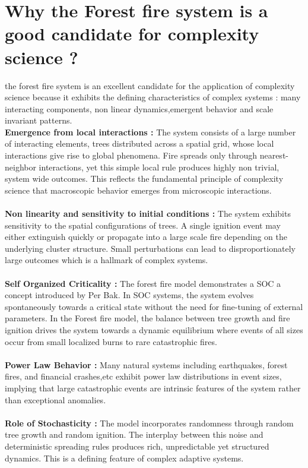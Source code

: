 \documentclass{article}
\begin{document}
\section{Why the Forest fire system is a good candidate for complexity science ?}
the forest fire system is an excellent candidate for the application of complexity science because it exhibits the defining characteristics of complex systems : many interacting components, non linear dynamics,emergent behavior and scale invariant patterns.\\
\textbf{Emergence from local interactions :} The system consists of a large number of interacting elements, trees distributed across a spatial grid, whose local interactions give rise to global phenomena. Fire spreads only through nearest-neighbor interactions, yet this simple local rule produces highly non trivial, system wide outcomes. This reflects the fundamental principle of complexity science that macroscopic behavior emerges from microscopic interactions.\\
\\
\textbf{Non linearity and sensitivity to initial conditions : } The system exhibits sensitivity to the spatial configurations of trees. A single ignition event may either extinguish quickly or propagate into a large scale fire depending on the underlying cluster structure. Small perturbations can lead to disproportionately large outcomes which is a hallmark of complex systems.\\
\\
\textbf{Self Organized Criticality : } The forest fire model demonstrates a SOC a concept introduced by Per Bak. In SOC systems, the system evolves spontaneously towards a critical state without the need for fine-tuning of external parameters. In the Forest fire model, the balance between tree growth and fire ignition drives the system towards a dynamic equilibrium where events of all sizes occur from small localized burns to rare catastrophic fires.\\
\\
\textbf{Power Law Behavior :} Many natural systems including earthquakes, forest fires, and financial crashes,etc exhibit power law distributions in event sizes, implying that large catastrophic events are intrinsic features of the system rather than exceptional anomalies.\\
\\
\textbf{Role of Stochasticity :} The model incorporates randomness through random tree growth and random ignition. The interplay between this noise and deterministic spreading rules produces rich, unpredictable yet structured dynamics. This is a defining feature of complex adaptive systems.\\
\\
\end{document}
